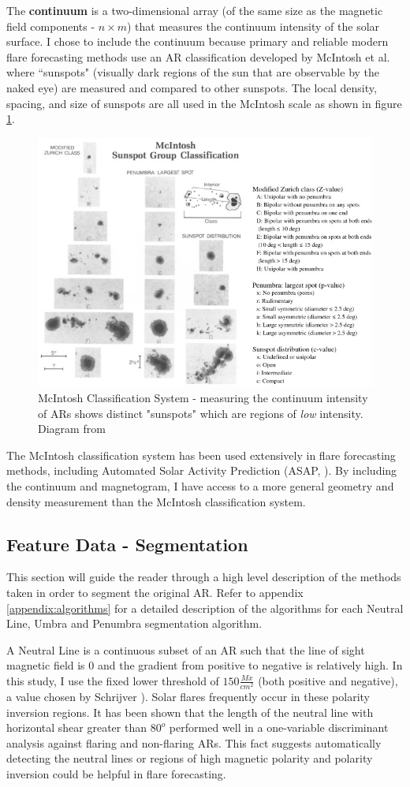 \documentclass[defaultstyle,11pt]{thesis}
\begin{document}
The \textbf{continuum} is a two-dimensional array (of the same size as the magnetic field components - $n \times m$) that measures the continuum intensity of the solar surface. I chose to include the continuum because primary and reliable modern flare forecasting methods use an AR classification developed by McIntosh et al. \cite{MCintosh} where ``sunspots" (visually dark regions of the sun that are observable by the naked eye) are measured and compared to other sunspots. The local density, spacing, and size of sunspots are all used in the McIntosh scale as shown in figure \ref{fig:mcintoshclass}. 
\begin{figure}[h]
\centering
\includegraphics[width=0.5\linewidth]{ThesisFilePkg/figures/data/mcintosh.jpg}
\caption{McIntosh Classification System - measuring the continuum intensity of ARs shows distinct "sunspots" which are regions of \textit{low} intensity. Diagram from \cite{MCintosh}}
\label{fig:mcintoshclass}
\end{figure}
The McIntosh classification system has been used extensively in flare forecasting methods, including Automated Solar Activity Prediction (ASAP, \cite{ASAP}). By including the continuum and magnetogram, I have access to a more general geometry and density measurement than the McIntosh classification system. 

\subsection{Feature Data - Segmentation}
\label{subregions}
 This section will guide the reader through a high level description of the methods taken in order to segment the original AR. Refer to appendix \ref{appendix:algorithms} for a detailed description of the algorithms for each Neutral Line, Umbra and Penumbra segmentation algorithm. 

A Neutral Line is a continuous subset of an AR such that the line of sight magnetic field is $0$ and the gradient from positive to negative is relatively high. In this study, I use the fixed lower threshold of $150 \frac{Mx}{cm^2}$ (both positive and negative), a value chosen by Schrijver \cite{schrijver}). Solar flares frequently occur in these polarity inversion regions. It has been shown \cite{Properties2} that the length of the neutral line with horizontal shear greater than $80^o$ performed well in a one-variable discriminant analysis against flaring and non-flaring ARs. This fact suggests automatically detecting the neutral lines or regions of high magnetic polarity and polarity inversion could be helpful in flare forecasting.
\end{document}

